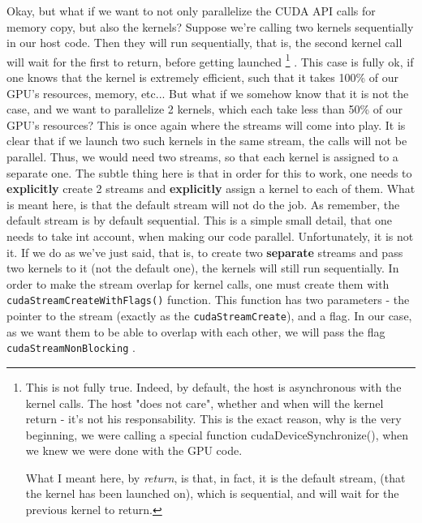 Okay, but what if we want to not only parallelize the CUDA API calls for memory copy, but also the kernels? 
Suppose we're calling two kernels sequentially in our host code. Then they will run sequentially, that is, the second kernel call will wait for the first to 
return, before getting launched \footnote{
 This is not fully true. Indeed, by default, the host is asynchronous with the kernel calls. The host "does not care", whether and when will the 
 kernel return - it's not his responsability. This is the exact reason, why is the very beginning, we were calling a special function 
 {\selectfont cudaDeviceSynchronize()}, when we knew we were done with the GPU code. 

 What I meant here, by \textit{return}, is that, in fact, it is the default stream, (that the kernel has been launched on), which is sequential, and will wait for the previous kernel to return.
}
. This case is fully ok, if one knows that the kernel is extremely efficient, such that it takes 100\% of our GPU's resources, memory, etc...
But what if we somehow know that it is not the case, and we want to parallelize 2 kernels, which each take less than 50\% of our GPU's resources? 
This is once again where the streams will come into play. 
It is clear that if we launch two such kernels in the same stream, the calls will not be parallel. Thus, we would need two streams, so that each kernel is assigned to a separate one.
The subtle thing here is that in order for this to work, one needs to \textbf{explicitly} create 2 streams and \textbf{explicitly} assign a kernel to each of them. 
What is meant here, is that the default stream will not do the job. As remember, the default stream is by default sequential. This is a simple small detail, that one needs to take int account, when 
making our code parallel.
Unfortunately, it is not it. If we do as we've just said, that is, to create two \textbf{separate} streams and pass two kernels to it (not the default one), the kernels will still run sequentially.
In order to make the stream overlap for kernel calls, one must create them with \verb|cudaStreamCreateWithFlags()| function. This function has two parameters - the pointer to the stream (exactly as the \verb|cudaStreamCreate|), 
and a flag. In our case, as we want them to be able to overlap with each other, we will pass the flag \verb|cudaStreamNonBlocking| \cite{streams_best_practices}. 
